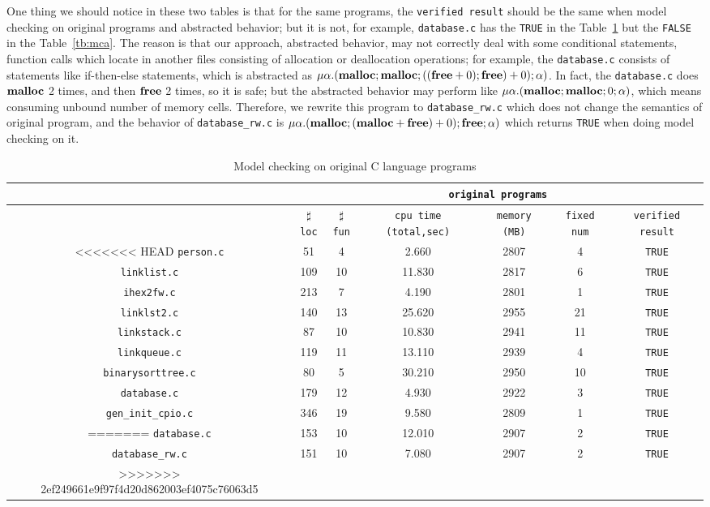 One thing we should notice in these two tables is that for the same
programs, the \texttt{verified result} should be the same when model
checking on original programs and abstracted behavior; but it is not,
for example, \texttt{database.c} has the \texttt{TRUE} in the
Table~\ref{tb:mcc} but the \texttt{FALSE} in the
Table~\ref{tb:mca}. The reason is that our approach, abstracted
behavior, may not correctly deal with some conditional statements,
function calls which locate in another files consisting of allocation
or deallocation operations; for example, the \texttt{database.c}
consists of statements like if-then-else statements, which is
abstracted as $\mu\alpha.(\mathbf{malloc};\mathbf{malloc};((\mathbf{free} + 0);\mathbf{free}) +
0);\alpha)$. In fact, the \texttt{database.c} does $\mathbf{malloc}$ 2 times,
and then $\mathbf{free}$ 2 times, so it is safe; but the abstracted behavior
may perform like $\mu\alpha.(\mathbf{malloc};\mathbf{malloc};0;\alpha)$, which means
consuming unbound number of memory cells. Therefore, we rewrite this
program to \texttt{database\_rw.c} which does not change the semantics
of original program, and the behavior of \texttt{database\_rw.c} is
$\mu\alpha.(\mathbf{malloc};(\mathbf{malloc} + \mathbf{free}) + 0);\mathbf{free};\alpha)$ which
returns \texttt{TRUE} when doing model checking on it.

\begin{table}
  \scriptsize
\begin{tabular}{|c|c|c|c|c|c|c|}
\hline
& \multicolumn{6}{|c|}{\texttt{original programs}}  \\
\hline
 & $\sharp$\texttt{loc} & $\sharp$\texttt{fun} & \texttt{cpu time (total,sec)} & \texttt{memory (MB)} & \texttt{fixed num}& \texttt{verified result} \\
\hline
<<<<<<< HEAD
\texttt{person.c} & 51 & 4 & 2.660 & 2807 & 4 & \texttt{TRUE}   \\
\hline
\texttt{linklist.c} & 109 & 10 & 11.830 & 2817 & 6 & \texttt{TRUE}  \\
\hline
\texttt{ihex2fw.c} & 213 & 7 & 4.190 & 2801 & 1 &  \texttt{TRUE} \\
\hline
\texttt{linklst2.c} & 140 & 13 & 25.620 & 2955 & 21 & \texttt{TRUE} \\
\hline
\texttt{linkstack.c}  & 87 & 10 & 10.830 & 2941 & 11 & \texttt{TRUE} \\
\hline
\texttt{linkqueue.c} & 119 & 11 & 13.110 & 2939 & 4 & \texttt{TRUE} \\
\hline
\texttt{binarysorttree.c} & 80 & 5 & 30.210 & 2950 & 10 &\texttt{TRUE}  \\
\hline
\texttt{database.c} & 179 & 12 & 4.930 & 2922 & 3 & \texttt{TRUE} \\
\hline
\texttt{gen\_init\_cpio.c} & 346 & 19 & 9.580 & 2809 & 1 & \texttt{TRUE} \\
=======
\texttt{database.c} & 153 & 10 & 12.010 & 2907 & 2  & \texttt{TRUE}  \\
\hline
\texttt{database\_rw.c} & 151 & 10 & 7.080 & 2907 & 2  & \texttt{TRUE}  \\
>>>>>>> 2ef249661e9f97f4d20d862003ef4075c76063d5
\hline
\end{tabular}
\caption{Model checking on original C language programs}
\label{tb:mcc}
\end{table}

